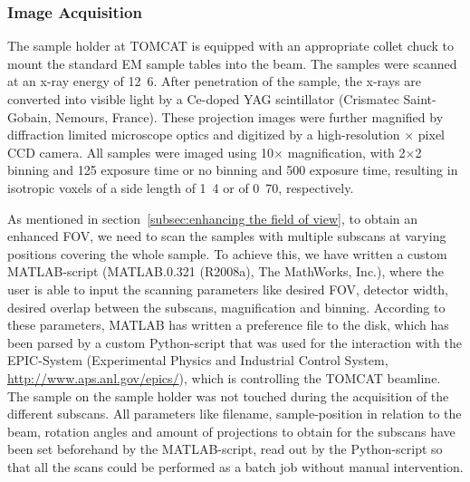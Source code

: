 \subsubsection{Image Acquisition}
The sample holder at TOMCAT is equipped with an appropriate collet chuck to mount the standard EM sample tables into the beam. The samples were scanned at an x-ray energy of \unit{12.6}{\kilo\electronvolt}. After penetration of the sample, the x-rays are converted into visible light by a Ce-doped YAG scintillator (Crismatec Saint-Gobain, Nemours, France). These projection images were further magnified by diffraction limited microscope optics and digitized by a high-resolution $\times$ pixel CCD camera. All samples were imaged using 10$\times$ magnification, with 2$\times$2 binning and \unit{125}{\milli\second} exposure time or no binning and \unit{500}{\milli\second} exposure time, resulting in isotropic voxels of a side length of \unit{1.4}{\micro\meter} or of \unit{0.70}{\micro\meter}, respectively.

As mentioned in section~\ref{subsec:enhancing the field of view}, to obtain an enhanced FOV, we need to scan the samples with multiple subscans at varying positions covering the whole sample. To achieve this, we have written a custom MATLAB-script (MATLAB.0.321 (R2008a), The MathWorks, Inc.), where the user is able to input the scanning parameters like desired FOV, detector width, desired overlap between the subscans, magnification and binning. According to these parameters, MATLAB has written a preference file to the disk, which has been parsed by a custom Python-script that was used for the interaction with the EPIC-System (Experimental Physics and Industrial Control System, \url{http://www.aps.anl.gov/epics/}), which is controlling the TOMCAT beamline. The sample on the sample holder was not touched during the acquisition of the different subscans. All parameters like filename, sample-position in relation to the beam, rotation angles and amount of projections to obtain for the subscans have been set beforehand by the MATLAB-script, read out by the Python-script so that all the scans could be performed as a batch job without manual intervention.

